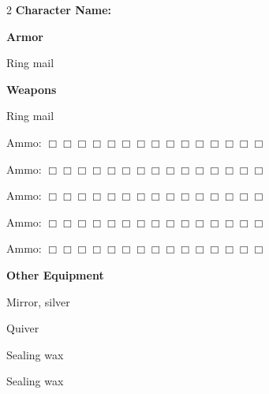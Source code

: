 \documentclass[10pt]{article}
\begin{document}
\begin{multicols}{2}
\textbf{Character Name:} \hrulefill

\vspace{24pt}

\textbf{Armor}


Ring mail




\hrulefill


\hrulefill


\hrulefill



\vspace{24pt}

\textbf{Weapons}


Ring mail




\hrulefill

Ammo: $\Box \Box \Box \Box \Box \Box \Box \Box \Box \Box \Box \Box \Box \Box \Box$ 


\hrulefill

Ammo: $\Box \Box \Box \Box \Box \Box \Box \Box \Box \Box \Box \Box \Box \Box \Box$ 


\hrulefill

Ammo: $\Box \Box \Box \Box \Box \Box \Box \Box \Box \Box \Box \Box \Box \Box \Box$ 


\hrulefill

Ammo: $\Box \Box \Box \Box \Box \Box \Box \Box \Box \Box \Box \Box \Box \Box \Box$ 


\hrulefill

Ammo: $\Box \Box \Box \Box \Box \Box \Box \Box \Box \Box \Box \Box \Box \Box \Box$ 



\vspace{24pt}

\textbf{Other Equipment}


Mirror, silver


Quiver


Sealing wax


Sealing wax




\hrulefill


\hrulefill


\hrulefill


\hrulefill


\hrulefill


\hrulefill


\hrulefill


\hrulefill



\end{multicols}
\end{document}
